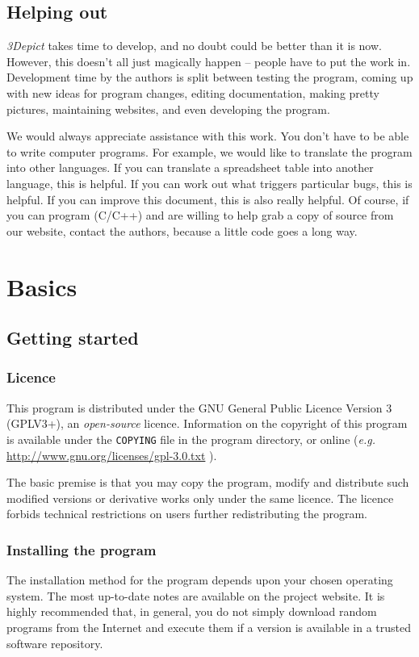 \documentclass[10pt]{article}
\begin{document}
\subsection{Helping out}

\emph{3Depict} takes time to develop, and no doubt could be better than it is now. However, this doesn't all just magically happen -- people have to put the work in. Development time by the authors is split between testing the program, coming up with new ideas for program changes, editing documentation, making pretty pictures, maintaining websites, and even developing the program. 

We would always appreciate assistance with this work. You don't have to be able to write computer programs. For example, we would like to translate the program into other languages. If you can translate a spreadsheet table into another language, this is helpful. If you can work out what triggers particular bugs, this is  helpful. If you can improve this document, this is also really helpful. Of course, if you can program (C/C++) and are willing to help grab a copy of source from our website, contact the authors, because a little code goes a long way.

\section{Basics}
\subsection{Getting started}
\subsubsection{Licence}
\label{sec:licence} 
This program is distributed under the GNU General Public Licence Version 3 (GPLV3+), an \textit{open-source} licence. Information on the copyright of this program is available under the \texttt{COPYING} file in the program directory, or online (\emph{e.g.} \url{http://www.gnu.org/licenses/gpl-3.0.txt} ).

The basic premise is that you may copy the program, modify and distribute such modified versions or derivative works only under the same licence. The licence forbids technical restrictions on users further redistributing the program.
 
\subsubsection{Installing the program}
The installation method for the program depends upon your chosen operating system. The most up-to-date notes are available on the project website. It is highly recommended that, in general, you do not simply download random programs from the Internet and execute them if a version is available in a trusted software repository. 
\end{document}
